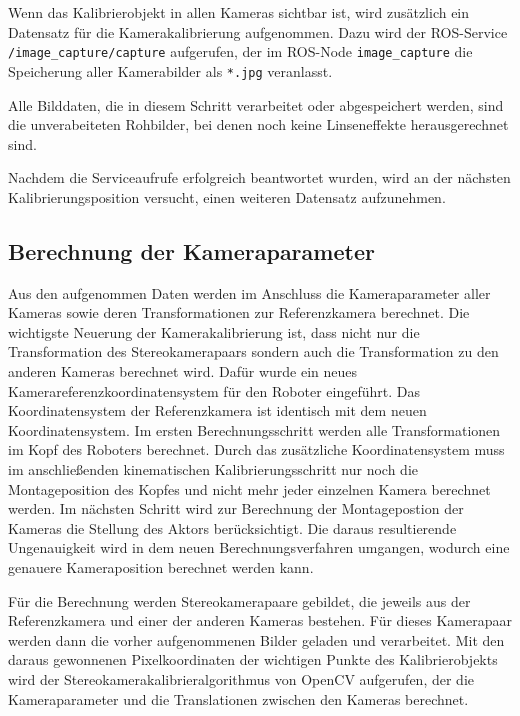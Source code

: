 Wenn das Kalibrierobjekt in allen Kameras sichtbar ist, wird zusätzlich ein 
Datensatz für die Kamerakalibrierung aufgenommen. Dazu wird der \ac{ROS}-Service
\texttt{/image\_capture/capture} aufgerufen, der im \ac{ROS}-Node \texttt{image\_capture}
die Speicherung aller Kamerabilder als \texttt{*.jpg} veranlasst.

Alle Bilddaten, die in diesem Schritt verarbeitet oder abgespeichert werden, sind
die unverabeiteten Rohbilder, bei denen noch keine Linseneffekte herausgerechnet
sind.

Nachdem die Serviceaufrufe erfolgreich beantwortet wurden, wird an der nächsten
Kalibrierungsposition versucht, einen weiteren Datensatz aufzunehmen.

\subsection{Berechnung der Kameraparameter}
\label{sub:Berechnung der Kameraparameter}

Aus den aufgenommen Daten werden im Anschluss die Kameraparameter aller Kameras sowie
deren Transformationen zur Referenzkamera berechnet. Die wichtigste Neuerung der 
Kamerakalibrierung ist, dass nicht nur die Transformation des Stereokamerapaars
sondern auch die Transformation zu den anderen Kameras berechnet wird. Dafür 
wurde ein neues Kamerareferenzkoordinatensystem für den Roboter eingeführt. Das
Koordinatensystem der Referenzkamera ist identisch mit dem neuen Koordinatensystem.
Im ersten Berechnungsschritt werden alle Transformationen im Kopf des 
Roboters berechnet. Durch das zusätzliche Koordinatensystem muss 
im anschließenden kinematischen Kalibrierungsschritt nur noch die Montageposition
des Kopfes und nicht mehr jeder einzelnen Kamera berechnet werden. Im nächsten
Schritt wird zur Berechnung der Montagepostion der Kameras die Stellung des 
Aktors berücksichtigt. Die daraus resultierende Ungenauigkeit wird in dem neuen
Berechnungsverfahren umgangen, wodurch eine genauere Kameraposition berechnet
werden kann. 

Für die Berechnung werden Stereokamerapaare gebildet, die jeweils aus der
Referenzkamera und einer der anderen Kameras bestehen. Für dieses 
Kamerapaar werden dann die vorher aufgenommenen Bilder geladen und 
verarbeitet. Mit den daraus gewonnenen Pixelkoordinaten der wichtigen Punkte 
des Kalibrierobjekts wird der Stereokamerakalibrieralgorithmus von OpenCV 
aufgerufen, der die Kameraparameter und die Translationen zwischen den Kameras 
berechnet. 

